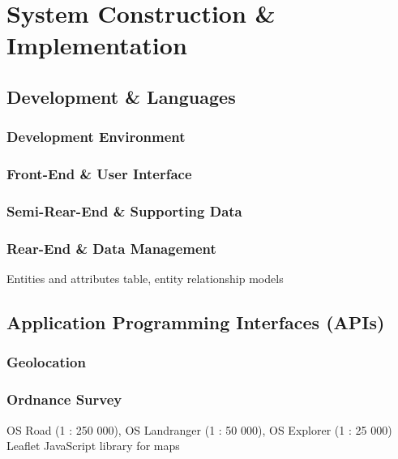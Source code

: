 \documentclass[11pt, english]{article}
\begin{document}
\newpage

\section{System Construction \& Implementation}\label{ch6}

	\subsection{Development \& Languages}

		\subsubsection{Development Environment}

		\subsubsection{Front-End \& User Interface}

		\subsubsection{Semi-Rear-End \& Supporting Data}

		\subsubsection{Rear-End \& Data Management}

		Entities and attributes table, entity relationship models

	\subsection{Application Programming Interfaces (APIs)}

		\subsubsection{Geolocation}

		\subsubsection{Ordnance Survey}

		OS Road (1 : 250 000), OS Landranger (1 : 50 000), OS Explorer (1 : 25 000)\\

		Leaflet JavaScript library for maps\\
\end{document}
